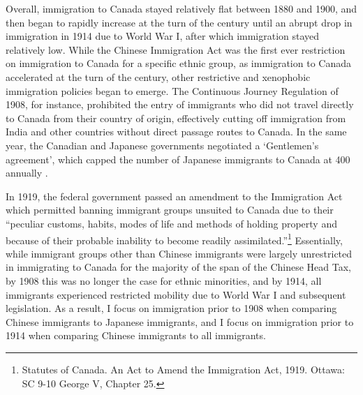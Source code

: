 
Overall, immigration to Canada stayed relatively flat between 1880 and 1900, and then began to rapidly increase at the turn of the century until an abrupt drop in immigration in 1914 due to World War I, after which immigration stayed relatively low. While the Chinese Immigration Act was the first ever restriction on immigration to Canada for a specific ethnic group, as immigration to Canada accelerated at the turn of the century, other restrictive and xenophobic immigration policies began to emerge. The Continuous Journey Regulation of 1908, for instance, prohibited the entry of immigrants who did not travel directly to Canada from their country of origin, effectively cutting off immigration from India and other countries without direct passage routes to Canada. 
In the same year, the Canadian and Japanese governments negotiated a `Gentlemen's agreement', which capped the number of Japanese immigrants to Canada at 400 annually \citep{pier21canimm}.

In 1919, the federal government passed an amendment to the Immigration Act which permitted banning immigrant groups unsuited to Canada due to their “peculiar customs, habits, modes of life and methods of holding property and because of their probable inability to become readily assimilated.”\footnote{Statutes of Canada. An Act to Amend the Immigration Act, 1919. Ottawa: SC 9-10 George V, Chapter 25.} 
Essentially, while immigrant groups other than Chinese immigrants were largely unrestricted in immigrating to Canada for the majority of the span of the Chinese Head Tax, by 1908 this was no longer the case for ethnic minorities, and by 1914, all immigrants experienced restricted mobility due to World War I and subsequent legislation. As a result, I focus on immigration prior to 1908 when comparing Chinese immigrants to Japanese immigrants, and I focus on immigration prior to 1914 when comparing Chinese immigrants to all immigrants.


